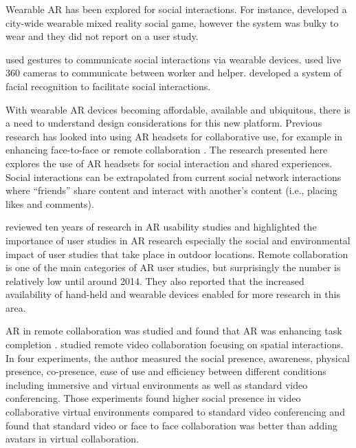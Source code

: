 Wearable AR has been explored for social interactions. For instance, \textcite{Cheok2002a} developed a city-wide wearable mixed reality social game, however the system was bulky to wear and they did not report on a user study. 

\textcite{Amores2015} used gestures to communicate social interactions via wearable devices. \textcite{Lee2019} used live 360 cameras to communicate between worker and helper. \textcite{Shu2018} developed a system of facial recognition to facilitate social interactions. 

With wearable AR devices becoming affordable, available and ubiquitous, there is a need to understand design considerations for this new platform. Previous research has looked into using AR headsets for collaborative use, for example in enhancing face-to-face \cite{Billinghurst2002} or remote collaboration \cite{Gupta2016}. The research presented here explores the use of AR headsets for social interaction and shared experiences. Social interactions can be extrapolated from current social network interactions where \enquote{friends} share content and interact with another's content (i.e., placing likes and comments).

\textcite{Dey2018} reviewed ten years of research in AR usability studies and highlighted the importance of user studies in AR research especially the social and environmental impact of user studies that take place in outdoor locations. Remote collaboration is one of the main categories of AR user studies, but surprisingly the number is relatively low until around 2014. They also reported that the increased availability of hand-held and wearable devices enabled for more research in this area. 

AR in remote collaboration was studied and found that AR was enhancing task completion \cite{Kim2014, Tversky2015, Gupta2016, Kim2015}.
\textcite{hauber2008understanding} studied remote video collaboration focusing on spatial interactions. In four experiments, the author measured the social presence, awareness, physical presence, co-presence, ease of use and efficiency between different conditions including immersive and virtual environments as well as standard video conferencing. Those experiments found higher social presence in video collaborative virtual environments compared to standard video conferencing and found that standard video or face to face collaboration was better than adding avatars in virtual collaboration.


